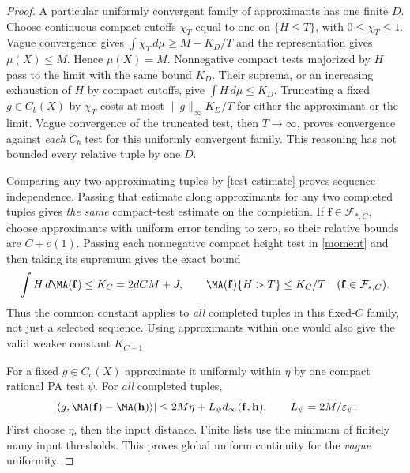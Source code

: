 \begin{proof}
A particular uniformly convergent family of approximants has one finite
$D$. Choose continuous compact cutoffs $\chi_T$ equal to one on
$\{H\leq T\}$, with $0\leq\chi_T\leq1$.
Vague convergence gives $\int\chi_T\,d\mu\geq M-K_D/T$ and the
representation gives $\mu(X)\leq M$. Hence $\mu(X)=M$.
Nonnegative compact tests majorized by $H$ pass to the limit with the
same bound $K_D$. Their suprema, or an increasing exhaustion of $H$ by
compact cutoffs, give $\int H\,d\mu\leq K_D$.
Truncating a fixed $g\in C_b(X)$ by $\chi_T$ costs at most
$\|g\|_\infty K_D/T$ for either the approximant or the limit.
Vague convergence of the truncated test, then $T\to\infty$, proves
convergence against \emph{each} $C_b$ test for this uniformly convergent
family. This reasoning has not bounded every relative tuple by one $D$.

Comparing any two approximating tuples by \eqref{test-estimate} proves
sequence independence. Passing that estimate along approximants for
any two completed tuples gives \emph{the same} compact-test estimate
on the completion. If $\mathbf f\in\mathcal F_{*,C}$, choose approximants
with uniform error tending to zero, so their relative bounds are
$C+o(1)$. Passing each nonnegative compact height test in
\eqref{moment} and then taking its supremum gives the exact bound
\begin{equation}\label{completed-moment}
 \int H\,d\MA(\mathbf f)\leq K_C=2dCM+J,
 \qquad \MA(\mathbf f)\{H>T\}\leq K_C/T
       \quad(\mathbf f\in\mathcal F_{*,C}).
\end{equation}
Thus the common constant applies to \emph{all} completed tuples in
this fixed-$C$ family, not just a selected sequence. Using approximants
within one would also give the valid weaker constant $K_{C+1}$.

For a fixed $g\in C_c(X)$ approximate it uniformly within $\eta$ by
one compact rational PA test $\psi$. For \emph{all} completed tuples,
\[
 |\langle g,\MA(\mathbf f)-\MA(\mathbf h)\rangle|
 \leq2M\eta+L_\psi d_\infty(\mathbf f,\mathbf h),\qquad
 L_\psi=2M/\varepsilon_\psi.
\]
First choose $\eta$, then the input distance. Finite lists use the
minimum of finitely many input thresholds. This proves global uniform
continuity for the \emph{vague} uniformity.


\end{proof}
